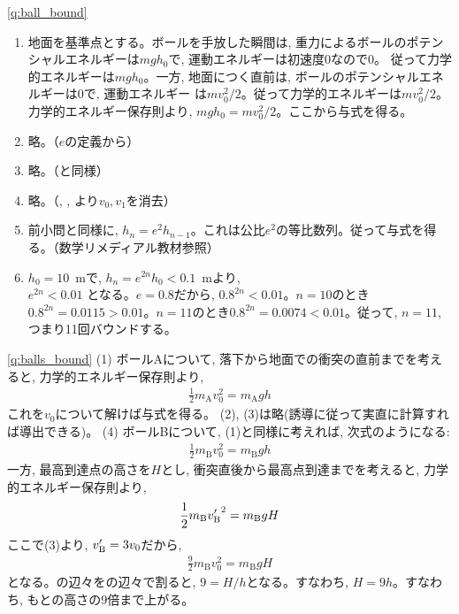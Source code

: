 \ref{q:ball_bound}
\begin{enumerate}
\item 地面を基準点とする。ボールを手放した瞬間は, 重力によるボールのポテンシャルエネルギーは$mgh_0$で, 運動エネルギーは初速度0なので$0$。
従って力学的エネルギーは$mgh_0$。一方, 地面につく直前は, ボールのポテンシャルエネルギーは$0$で, 運動エネルギー
は$mv_0^2/2$。従って力学的エネルギーは$mv_0^2/2$。力学的エネルギー保存則より, $mgh_0=mv_0^2/2$。ここから与式を得る。
\item 略。（$e$の定義から）
\item 略。（と同様）
\item 略。（, , より$v_0, v_1$を消去）
\item 前小問と同様に, $h_n=e^2h_{n-1}$。これは公比$e^2$の等比数列。従って与式を得る。（数学リメディアル教材参照）
\item $h_0=10$~mで, $h_n=e^{2n}h_0<0.1$~mより, \\
$e^{2n}<0.01$
となる。$e=0.8$だから, $0.8^{2n}<0.01$。$n=10$のとき
$0.8^{2n}=0.0115>0.01$。$n=11$のとき$0.8^{2n}=0.0074<0.01$。従って, $n=11$, つまり11回バウンドする。
\end{enumerate}
\vspace{0.2cm}


%
\ref{q:balls_bound}
(1) ボールAについて, 落下から地面での衝突の直前までを考えると, 力学的エネルギー保存則より, 
\begin{eqnarray}
\frac{1}{2}m_{\text{A}}v_0^2=m_{\text{A}}gh\label{eq:balls_bound_ans2}
\end{eqnarray}
これを$v_0$について解けば与式を得る。\mv
(2), (3)は略(誘導に従って実直に計算すれば導出できる)。\mv
(4) ボールBについて, (1)と同様に考えれば, 次式のようになる: 
\begin{eqnarray}
\frac{1}{2}m_{\text{B}}v_0^2=m_{\text{B}}gh\label{eq:balls_bound_ans3}
\end{eqnarray}
一方, 最高到達点の高さを$H$とし, 衝突直後から最高点到達までを考えると, 力学的エネルギー保存則より, 
\begin{eqnarray*}
\frac{1}{2}m_{\text{B}}{v'_{\text B}}^2=m_{\text{B}}gH
\end{eqnarray*}
ここで(3)より, $v'_{\text B}=3v_0$だから, 
\begin{eqnarray}
\frac{9}{2}m_{\text{B}}v_0^2=m_{\text{B}}gH\label{eq:balls_bound_ans4}
\end{eqnarray}
となる。の辺々をの辺々で割ると, 
$9=H/h$となる。すなわち, $H=9h$。すなわち, もとの高さの9倍まで上がる。
\mv


